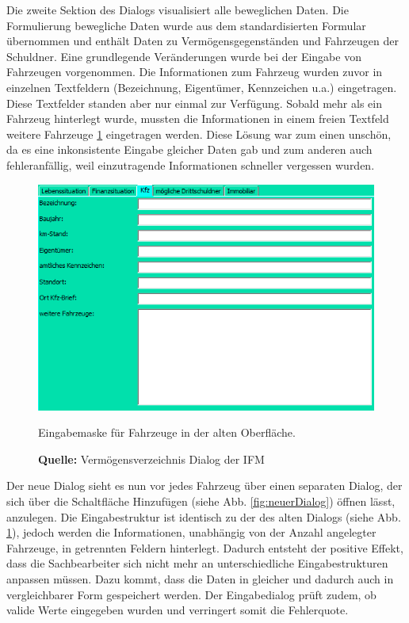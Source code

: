 Die zweite Sektion des Dialogs visualisiert alle beweglichen Daten. Die Formulierung \glqq bewegliche Daten\grqq{} wurde aus dem standardisierten Formular übernommen und enthält Daten zu Vermögensgegenständen und Fahrzeugen der Schuldner. Eine grundlegende Veränderungen wurde bei der Eingabe von Fahrzeugen vorgenommen. Die Informationen zum Fahrzeug wurden zuvor in einzelnen Textfeldern (Bezeichnung, Eigentümer, Kennzeichen u.a.) eingetragen. Diese Textfelder standen aber nur einmal zur Verfügung. Sobald mehr als ein Fahrzeug hinterlegt wurde, mussten die Informationen in einem freien Textfeld \glqq weitere Fahrzeuge\grqq{} \ref{fig:fahrzeugTab} eingetragen werden. Diese Lösung war zum einen unschön, da es eine inkonsistente Eingabe gleicher Daten gab und zum anderen auch fehleranfällig, weil einzutragende Informationen schneller vergessen wurden. 
\begin{figure}[H]
  \centering
  \includegraphics[scale=0.9]{img/FahrzeugTab.PNG}
  \caption{Eingabemaske für Fahrzeuge in der alten Oberfläche.}
    \caption*{\textbf{Quelle:} Vermögensverzeichnis Dialog der IFM}
  \label{fig:fahrzeugTab}
\end{figure}
Der neue Dialog sieht es nun vor jedes Fahrzeug über einen separaten Dialog, der sich über die Schaltfläche \glqq Hinzufügen\grqq{} (siehe Abb. \ref{fig:neuerDialog}) öffnen lässt, anzulegen. Die Eingabestruktur ist identisch zu der des alten Dialogs (siehe Abb. \ref{fig:fahrzeugTab}), jedoch werden die Informationen, unabhängig von der Anzahl angelegter Fahrzeuge, in getrennten Feldern hinterlegt. Dadurch entsteht der positive Effekt, dass die Sachbearbeiter sich nicht mehr an unterschiedliche Eingabestrukturen anpassen müssen. Dazu kommt, dass die Daten in gleicher und dadurch auch in vergleichbarer Form gespeichert werden. Der Eingabedialog prüft zudem, ob valide Werte eingegeben wurden und verringert somit die Fehlerquote.
